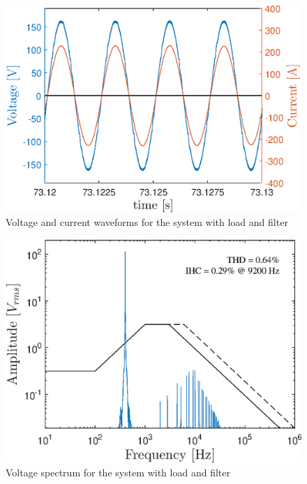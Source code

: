 \begin{figure}[!h] %
	\centering
	\includegraphics[width=0.27\textheight]{Figures/artigo_filt_3.eps}
	\caption{Voltage and current waveforms for the system with load and filter}
	\label{fig:artigo_filt_3.eps}
\end{figure}

\begin{figure}[!h] %
	\centering
	\includegraphics[width=0.27\textheight]{Figures/artigo_filt_4.eps}
	\caption{Voltage spectrum for the system with load and filter}
	\label{fig:artigo_filt_4.eps}
\end{figure}
